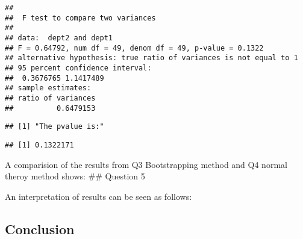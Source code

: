 \documentclass[]{article}
\begin{document}
\begin{verbatim}
## 
##  F test to compare two variances
## 
## data:  dept2 and dept1
## F = 0.64792, num df = 49, denom df = 49, p-value = 0.1322
## alternative hypothesis: true ratio of variances is not equal to 1
## 95 percent confidence interval:
##  0.3676765 1.1417489
## sample estimates:
## ratio of variances 
##          0.6479153
\end{verbatim}

\begin{verbatim}
## [1] "The pvalue is:"
\end{verbatim}

\begin{verbatim}
## [1] 0.1322171
\end{verbatim}

A comparision of the results from Q3 Bootstrapping method and Q4 normal
theroy method shows: \#\# Question 5

An interpretation of results can be seen as follows:

\subsection{Conclusion}\label{conclusion}
\end{document}
